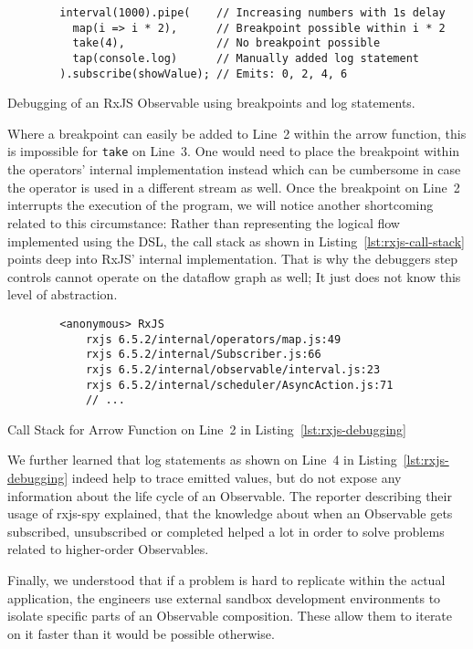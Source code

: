 \documentclass[12pt,a4paper]{article}
\begin{document}
\begin{listing}[H]
	\begin{verbatim}
		interval(1000).pipe(    // Increasing numbers with 1s delay
		  map(i => i * 2),      // Breakpoint possible within i * 2
		  take(4),              // No breakpoint possible
		  tap(console.log)      // Manually added log statement
		).subscribe(showValue); // Emits: 0, 2, 4, 6
	\end{verbatim}
	\caption{Debugging of an RxJS Observable using breakpoints and log statements.}
	\label{lst:rxjs-debugging}
\end{listing}

Where a breakpoint can easily be added to Line~2 within the arrow function, this is impossible for \texttt{take} on Line~3. One would need to place the breakpoint within the operators' internal implementation instead which can be cumbersome in case the operator is used in a different stream as well. Once the breakpoint on Line~2 interrupts the execution of the program, we will notice another shortcoming related to this circumstance: Rather than representing the logical flow implemented using the DSL, the call stack as shown in Listing~\ref{lst:rxjs-call-stack} points deep into RxJS' internal implementation. That is why the debuggers step controls cannot operate on the dataflow graph as well; It just does not know this level of abstraction.

\begin{listing}[H]
	\begin{verbatim}
		<anonymous> RxJS
			rxjs 6.5.2/internal/operators/map.js:49
			rxjs 6.5.2/internal/Subscriber.js:66
			rxjs 6.5.2/internal/observable/interval.js:23
			rxjs 6.5.2/internal/scheduler/AsyncAction.js:71
			// ...
	\end{verbatim}
	\caption{Call Stack for Arrow Function on Line~2 in Listing~\ref{lst:rxjs-debugging}}
	\label{lst:rxjs-call-stack}
\end{listing}

We further learned that log statements as shown on Line~4 in Listing~\ref{lst:rxjs-debugging} indeed help to trace emitted values, but do not expose any information about the life cycle of an Observable. The reporter describing their usage of rxjs-spy explained, that the knowledge about when an Observable gets subscribed, unsubscribed or completed helped a lot in order to solve problems related to higher-order Observables.

Finally, we understood that if a problem is hard to replicate within the actual application, the engineers use external sandbox development environments to isolate specific parts of an Observable composition. These allow them to iterate on it faster than it would be possible otherwise.
\end{document}
